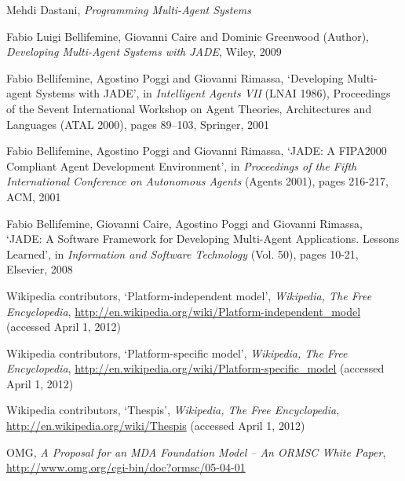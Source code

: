 \begin{thebibliography}{99}
Mehdi Dastani,
\textit{Programming Multi-Agent Systems}


Fabio Luigi Bellifemine, Giovanni Caire and Dominic Greenwood (Author),
\textit{Developing Multi-Agent Systems with JADE},
Wiley, 2009

Fabio Bellifemine, Agostino Poggi and Giovanni Rimassa,
`Developing Multi-agent Systems with JADE',
in \textit{Intelligent Agents VII} (LNAI 1986),
Proceedings of the Sevent International Workshop on Agent Theories, Architectures and Languages (ATAL 2000),
pages 89–103,
Springer, 2001

Fabio Bellifemine, Agostino Poggi and Giovanni Rimassa,
`JADE: A FIPA2000 Compliant Agent Development Environment',
in \textit{Proceedings of the Fifth International Conference on Autonomous Agents} (Agents 2001),
pages 216-217,
ACM, 2001

Fabio Bellifemine, Giovanni Caire, Agostino Poggi and Giovanni Rimassa,
`JADE: A Software Framework for Developing Multi-Agent Applications. Lessons Learned',
in \textit{Information and Software Technology} (Vol. 50),
pages 10-21,
Elsevier, 2008


Wikipedia contributors,
`Platform-independent model',
\textit{Wikipedia, The Free Encyclopedia},
\url{http://en.wikipedia.org/wiki/Platform-independent_model} (accessed April 1, 2012)

Wikipedia contributors,
`Platform-specific model',
\textit{Wikipedia, The Free Encyclopedia},
\url{http://en.wikipedia.org/wiki/Platform-specific_model} (accessed April 1, 2012)

Wikipedia contributors,
`Thespis',
\textit{Wikipedia, The Free Encyclopedia},
\url{http://en.wikipedia.org/wiki/Thespis} (accessed April 1, 2012)

OMG,
\textit{A Proposal for an MDA Foundation Model -- An ORMSC White Paper},
\url{http://www.omg.org/cgi-bin/doc?ormsc/05-04-01}

\end{thebibliography}